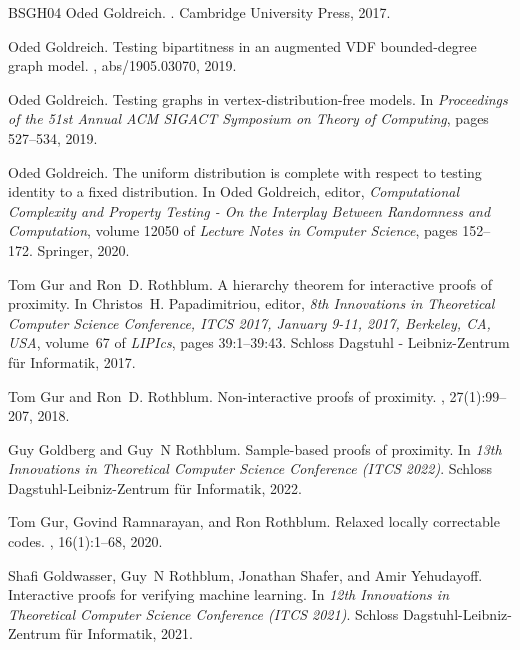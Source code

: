 \documentclass[10pt,a4paper]{article}
\begin{document}
\begin{thebibliography}{BSGH{\etalchar{+}}04}
Oded Goldreich.
.
\newblock Cambridge University Press, 2017.

Oded Goldreich.
\newblock Testing bipartitness in an augmented {VDF} bounded-degree graph
  model.
, abs/1905.03070, 2019.

Oded Goldreich.
\newblock Testing graphs in vertex-distribution-free models.
\newblock In {\em Proceedings of the 51st Annual ACM SIGACT Symposium on Theory
  of Computing}, pages 527--534, 2019.

Oded Goldreich.
\newblock The uniform distribution is complete with respect to testing identity
  to a fixed distribution.
\newblock In Oded Goldreich, editor, {\em Computational Complexity and Property
  Testing - On the Interplay Between Randomness and Computation}, volume 12050
  of {\em Lecture Notes in Computer Science}, pages 152--172. Springer, 2020.

Tom Gur and Ron~D. Rothblum.
\newblock A hierarchy theorem for interactive proofs of proximity.
\newblock In Christos~H. Papadimitriou, editor, {\em 8th Innovations in
  Theoretical Computer Science Conference, {ITCS} 2017, January 9-11, 2017,
  Berkeley, CA, {USA}}, volume~67 of {\em LIPIcs}, pages 39:1--39:43. Schloss
  Dagstuhl - Leibniz-Zentrum f{\"{u}}r Informatik, 2017.

Tom Gur and Ron~D. Rothblum.
\newblock Non-interactive proofs of proximity.
, 27(1):99--207, 2018.

Guy Goldberg and Guy~N Rothblum.
\newblock Sample-based proofs of proximity.
\newblock In {\em 13th Innovations in Theoretical Computer Science Conference
  (ITCS 2022)}. Schloss Dagstuhl-Leibniz-Zentrum f{\"u}r Informatik, 2022.

Tom Gur, Govind Ramnarayan, and Ron Rothblum.
\newblock Relaxed locally correctable codes.
, 16(1):1--68, 2020.

Shafi Goldwasser, Guy~N Rothblum, Jonathan Shafer, and Amir Yehudayoff.
\newblock Interactive proofs for verifying machine learning.
\newblock In {\em 12th Innovations in Theoretical Computer Science Conference
  (ITCS 2021)}. Schloss Dagstuhl-Leibniz-Zentrum f{\"u}r Informatik, 2021.


\end{thebibliography}
\end{document}
